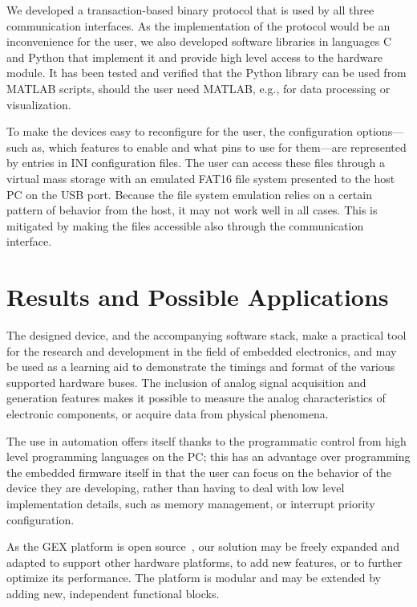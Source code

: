 We developed a transaction-based binary protocol that is used by all three communication interfaces. As the implementation of the protocol would be an inconvenience for the user, we also developed software libraries in languages C and Python that implement it and provide high level access to the hardware module. It has been tested and verified that the Python library can be used from MATLAB scripts, should the user need MATLAB, e.g., for data processing or visualization.

To make the devices easy to reconfigure for the user, the configuration options---such as, which features to enable and what pins to use for them---are represented by entries in INI configuration files. The user can access these files through a virtual mass storage with an emulated FAT16 file system presented to the host \gls{PC} on the \gls{USB} port. Because the file system emulation relies on a certain pattern of behavior from the host, it may not work well in all cases. This is mitigated by making the files accessible also through the communication interface.

\section{Results and Possible Applications}

The designed device, and the accompanying software stack, make a practical tool for the research and development in the field of embedded electronics, and may be used as a learning aid to demonstrate the timings and format of the various supported hardware buses. The inclusion of analog signal acquisition and generation features makes it possible to measure the analog characteristics of electronic components, or acquire data from physical phenomena. 

The use in automation offers itself thanks to the programmatic control from high level programming languages on the \gls{PC}; this has an advantage over programming the embedded firmware itself in that the user can focus on the behavior of the device they are developing, rather than having to deal with low level implementation details, such as memory management, or interrupt priority configuration.

As the GEX platform is open source~\cite{gex-gh}, our solution may be freely expanded and adapted to support other hardware platforms, to add new features, or to further optimize its performance. The platform is modular and may be extended by adding new, independent functional blocks.

